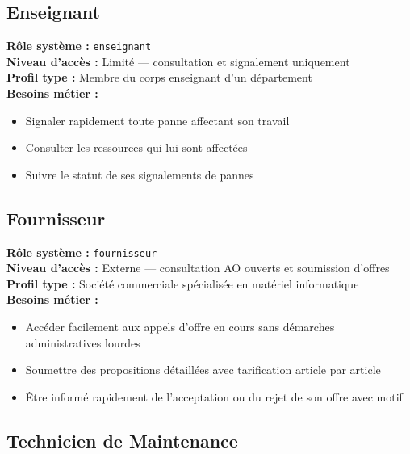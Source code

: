 \documentclass[12pt,a4paper]{report}
\begin{document}
\subsection{Enseignant}

\begin{tcolorbox}[exigbox, title=Enseignant]
\textbf{Rôle système :} \texttt{enseignant} \\
\textbf{Niveau d'accès :} Limité — consultation et signalement uniquement \\
\textbf{Profil type :} Membre du corps enseignant d'un département \\[6pt]
\textbf{Besoins métier :}
\begin{itemize}
    \item Signaler rapidement toute panne affectant son travail
    \item Consulter les ressources qui lui sont affectées
    \item Suivre le statut de ses signalements de pannes
\end{itemize}
\end{tcolorbox}

\subsection{Fournisseur}

\begin{tcolorbox}[exigbox, title=Fournisseur]
\textbf{Rôle système :} \texttt{fournisseur} \\
\textbf{Niveau d'accès :} Externe — consultation AO ouverts et soumission d'offres \\
\textbf{Profil type :} Société commerciale spécialisée en matériel informatique \\[6pt]
\textbf{Besoins métier :}
\begin{itemize}
    \item Accéder facilement aux appels d'offre en cours sans démarches administratives lourdes
    \item Soumettre des propositions détaillées avec tarification article par article
    \item Être informé rapidement de l'acceptation ou du rejet de son offre avec motif
\end{itemize}
\end{tcolorbox}

\subsection{Technicien de Maintenance}
\end{document}
